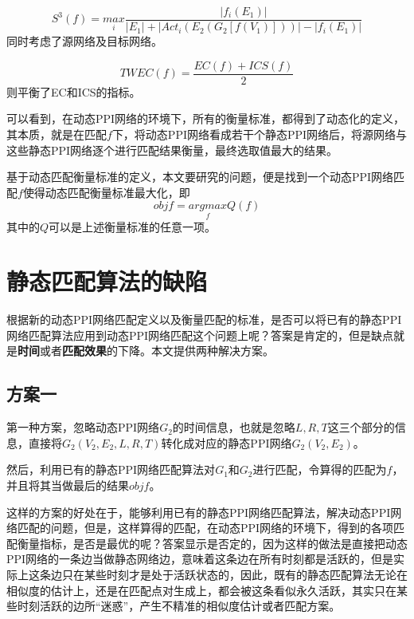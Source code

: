 \begin{equation}\label{myworks3define}
S^{3}(f)=\underset{i}{max}\frac{\left | f_i(E_1) \right |}{\left | E_1 \right |+\left |Act_i(E_2(G_2[f(V_1)])) \right |-\left | f_i(E_1) \right |}
\end{equation}
同时考虑了源网络及目标网络。

\begin{equation}\label{myworktwecdefine}
    TWEC(f)=\frac{EC(f)+ICS(f)}{2}
\end{equation}
则平衡了EC和ICS的指标。

可以看到，在动态PPI网络的环境下，所有的衡量标准，都得到了动态化的定义，其本质，就是在匹配$f$下，将动态PPI网络看成若干个静态PPI网络后，将源网络与这些静态PPI网络逐个进行匹配结果衡量，最终选取值最大的结果。

基于动态匹配衡量标准的定义，本文要研究的问题，便是找到一个动态PPI网络匹配$f$使得动态匹配衡量标准最大化，即
\begin{equation}\label{myworktwobjdefine}
    objf=\underset{f}{argmax}Q(f)
\end{equation}
其中的$Q$可以是上述衡量标准的任意一项。
\section{静态匹配算法的缺陷}
根据新的动态PPI网络匹配定义以及衡量匹配的标准，是否可以将已有的静态PPI网络匹配算法应用到动态PPI网络匹配这个问题上呢？答案是肯定的，但是缺点就是\textbf{时间}或者\textbf{匹配效果}的下降。本文提供两种解决方案。

\subsection{方案一}
第一种方案，忽略动态PPI网络$G_2$的时间信息，也就是忽略$L,R,T$这三个部分的信息，直接将$G_2(V_2,E_2,L,R,T)$转化成对应的静态PPI网络$G_2(V_2,E_2)$。

然后，利用已有的静态PPI网络匹配算法对$G_1$和$G_2$进行匹配，令算得的匹配为$f$，并且将其当做最后的结果$objf$。

这样的方案的好处在于，能够利用已有的静态PPI网络匹配算法，解决动态PPI网络匹配的问题，但是，这样算得的匹配，在动态PPI网络的环境下，得到的各项匹配衡量指标，是否是最优的呢？答案显示是否定的，因为这样的做法是直接把动态PPI网络的一条边当做静态网络边，意味着这条边在所有时刻都是活跃的，但是实际上这条边只在某些时刻才是处于活跃状态的，因此，既有的静态匹配算法无论在相似度的估计上，还是在匹配点对生成上，都会被这条看似永久活跃，其实只在某些时刻活跃的边所“迷惑”，产生不精准的相似度估计或者匹配方案。
